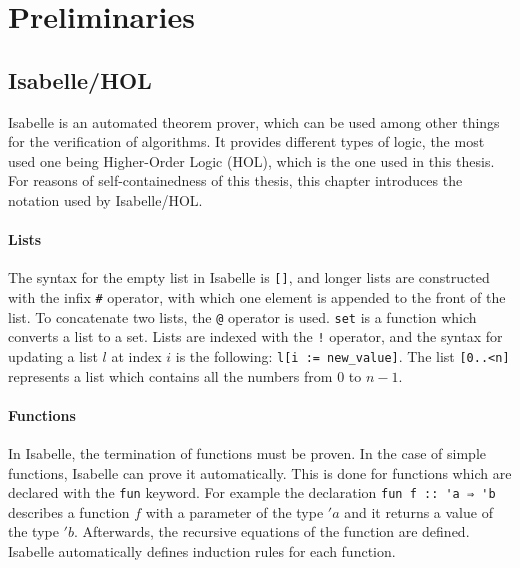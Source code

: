 
\chapter{Preliminaries}\label{chapter:preliminaries}

\section{Isabelle/HOL}

Isabelle\cite{isabelle} is an automated theorem prover, which can be used among other things for the verification of algorithms. It provides different types of logic, the most used one being Higher-Order Logic (HOL), which is the one used in this thesis. For reasons of self-containedness of this thesis, this chapter introduces the notation used by Isabelle/HOL.

\subsubsection{Lists}

The syntax for the empty list in Isabelle is \lstinline|[]|, and longer lists are constructed with the infix \lstinline|#| operator, with which one element is appended to the front of the list. To concatenate two lists, the \lstinline|@| operator is used. \lstinline|set| is a function which converts a list to a set. Lists are indexed with the \lstinline|!| operator, and the syntax for updating a list $l$ at index $i$ is the following: \lstinline|l[i := new_value]|. The list \lstinline|[0..<n]| represents a list which contains all the numbers from $0$ to $n-1$.

\subsubsection{Functions}

In Isabelle, the termination of functions must be proven. In the case of simple functions, Isabelle can prove it automatically. This is done for functions which are declared with the \lstinline{fun} keyword. For example the declaration \lstinline|fun f :: 'a ⇒ 'b| describes a function $f$ with a parameter of the type $'a$ and it returns a value of the type $'b$. Afterwards, the recursive equations of the function are defined. Isabelle automatically defines induction rules for each function.

